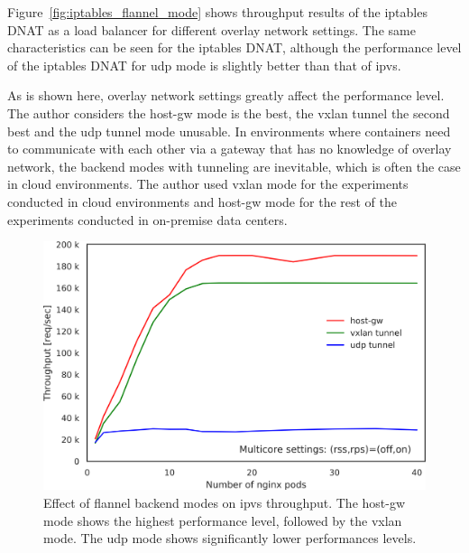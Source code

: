 Figure~\ref{fig:iptables_flannel_mode} shows throughput results of the iptables DNAT as a load balancer for different overlay network settings.
The same characteristics can be seen for the iptables DNAT, although the performance level of the iptables DNAT for udp mode is slightly better than that of ipvs.

As is shown here, overlay network settings greatly affect the performance level.
The author considers the host-gw mode is the best, the vxlan tunnel the second best and the udp tunnel mode unusable.
In environments where containers need to communicate with each other via a gateway that has no knowledge of overlay network, the backend modes with tunneling are inevitable, which is often the case in cloud environments. 
The author used vxlan mode for the experiments conducted in cloud environments and host-gw mode for the rest of the experiments conducted in on-premise data centers.

\begin{figure}[h]
  \centering
  \includegraphics[width=0.75\columnwidth]{Figs/ipvs_flannel_mode}

  \par\bigskip
  \centering
  \begin{minipage}{0.9\columnwidth}
    \caption[Effect of flannel backend modes on ipvs throughput]{
      Effect of flannel backend modes on ipvs throughput.
      The host-gw mode shows the highest performance level, followed by the vxlan mode.
      The udp mode shows significantly lower performances levels.
    }
    \label{fig:ipvs_flannel_mode}
  \end{minipage}
\end{figure}

